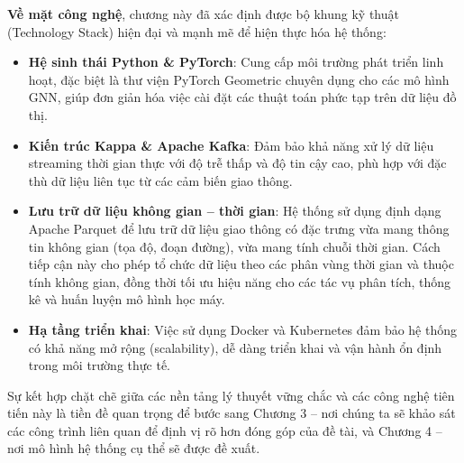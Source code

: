 \textbf{Về mặt công nghệ}, chương này đã xác định được bộ khung kỹ thuật (Technology Stack) hiện đại và mạnh mẽ để hiện thực hóa hệ thống:

\begin{itemize}
    \item \textbf{Hệ sinh thái Python \& PyTorch}: Cung cấp môi trường phát triển linh hoạt, đặc biệt là thư viện PyTorch Geometric chuyên dụng cho các mô hình GNN, giúp đơn giản hóa việc cài đặt các thuật toán phức tạp trên dữ liệu đồ thị.
    
    \item \textbf{Kiến trúc Kappa \& Apache Kafka}: Đảm bảo khả năng xử lý dữ liệu streaming thời gian thực với độ trễ thấp và độ tin cậy cao, phù hợp với đặc thù dữ liệu liên tục từ các cảm biến giao thông.
    
    \item \textbf{Lưu trữ dữ liệu không gian -- thời gian}: Hệ thống sử dụng định dạng Apache Parquet để lưu trữ dữ liệu giao thông có đặc trưng vừa mang thông tin không gian (tọa độ, đoạn đường), vừa mang tính chuỗi thời gian. Cách tiếp cận này cho phép tổ chức dữ liệu theo các phân vùng thời gian và thuộc tính không gian, đồng thời tối ưu hiệu năng cho các tác vụ phân tích, thống kê và huấn luyện mô hình học máy.
    
    \item \textbf{Hạ tầng triển khai}: Việc sử dụng Docker và Kubernetes đảm bảo hệ thống có khả năng mở rộng (scalability), dễ dàng triển khai và vận hành ổn định trong môi trường thực tế.
\end{itemize}

Sự kết hợp chặt chẽ giữa các nền tảng lý thuyết vững chắc và các công nghệ tiên tiến này là tiền đề quan trọng để bước sang Chương 3 -- nơi chúng ta sẽ khảo sát các công trình liên quan để định vị rõ hơn đóng góp của đề tài, và Chương 4 -- nơi mô hình hệ thống cụ thể sẽ được đề xuất.